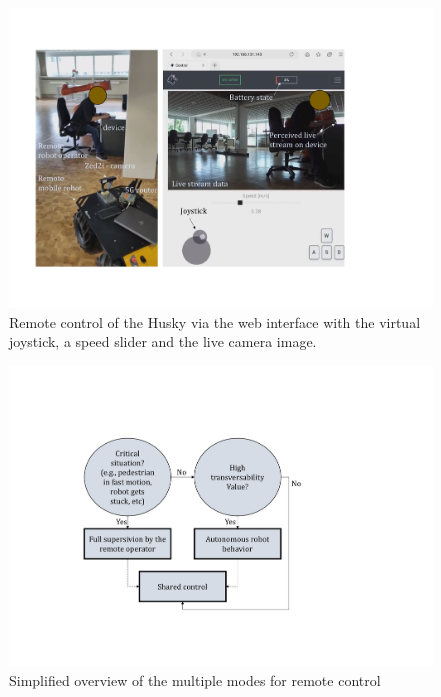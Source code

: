 \documentclass[letterpaper, 10 pt, conference]{ieeeconf}  %
\begin{document}
\begin{figure}[b]
    \centerline{\includegraphics[width=\columnwidth]{images/telehusky.pdf}}
    \caption{Remote control of the Husky via the web interface with the virtual joystick, a speed slider and the live camera image.}
    \label{fig:clip}
\end{figure}

   \begin{figure}[hb]
	\centerline{\includegraphics[width=\columnwidth]{images/statemachine.pdf}}
	\caption{Simplified overview of the multiple modes for remote control }
	\label{fig:statemachine}
\end{figure}
\end{document}
